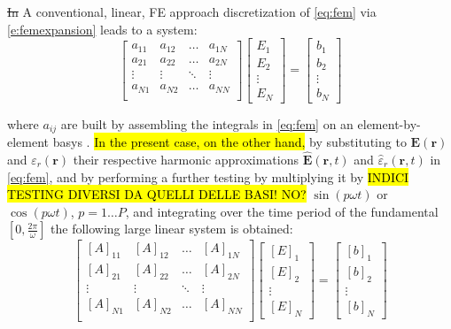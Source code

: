 \documentclass[journal]{IEEEtran}
\renewcommand{\vec}[1]{\mathbf{#1}}
\begin{document}
\st{In} A conventional, linear, FE approach discretization of \eqref{eq:fem} via
\eqref{e:femexpansion} leads to a system:
%
\begin{equation}\label{e:plainfem}
\begin{bmatrix}
a_{11} & a_{12} & \ldots & a_{1N} \\
a_{21} & a_{22} & \ldots & a_{2N} \\
\vdots & \vdots & \ddots & \vdots \\
a_{N1} & a_{N2} & \ldots & a_{NN} \\
\end{bmatrix}
\begin{bmatrix}
E_1\\
E_2\\
\vdots\\
E_N
\end{bmatrix}
=
\begin{bmatrix}
b_1\\
b_2\\
\vdots\\
b_N
\end{bmatrix}
\end{equation}

\noindent where $a_{ij}$ are built by assembling the integrals in \eqref{eq:fem}
on an element-by-element basys \cite{Pelosi2009}. \hl{In the present case, on the
other hand,} by substituting to $\vec{E}(\vec{r})$ and
${\varepsilon}_r(\vec{r})$ their respective harmonic approximations $\vec{\hat{E}}(\vec{r}, t)$ and
$\hat{{\varepsilon}}_r(\vec{r}, t)$ in \eqref{eq:fem}, and by performing
a further testing by multiplying it by \hl{INDICI TESTING DIVERSI DA QUELLI DELLE BASI! NO?} $\sin(p \omega t)$ or
$\cos(p \omega t)$, $p = 1 \dots P$, and integrating over the time period of the fundamental $\left [
0,\frac{2\pi}{\omega} \right ]$  the following large linear system is
obtained:
%
\begin{equation}\label{e:HBfem}
\begin{bmatrix}
[A]_{11} & [A]_{12} & \ldots & [A]_{1N} \\
[A]_{21} & [A]_{22} & \ldots & [A]_{2N} \\
\vdots & \vdots & \ddots & \vdots \\
[A]_{N1} & [A]_{N2} & \ldots & [A]_{NN} \\
\end{bmatrix}
\begin{bmatrix}
[E]_1\\
[E]_2\\
\vdots\\
[E]_N
\end{bmatrix}
=
\begin{bmatrix}
[b]_1\\
[b]_2\\
\vdots\\
[b]_N
\end{bmatrix}
\end{equation}
\end{document}
